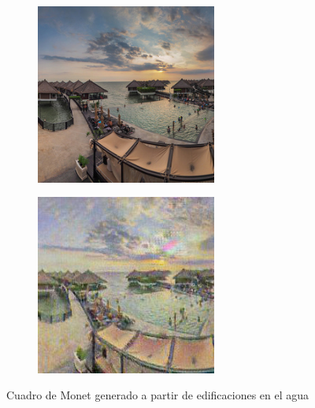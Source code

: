 \documentclass[[../main.tex]{subfiles}
\begin{document}
        \begin{figure}[!htb]
            \begin{subfigure}[b]{0.49\textwidth}
            \includegraphics[width=0.65\textwidth]{imagenes/imagen2cuadro/dataset/monet/2014-08-15 08_48_43.jpg}
            \end{subfigure}
        \hfill
            \begin{subfigure}[b]{0.49\textwidth}
            \includegraphics[width=0.65\textwidth]{imagenes/imagen2cuadro/dataset/monet/2014-08-15 08_48_43_2.jpg}
            \end{subfigure}
        \caption{Cuadro de Monet generado a partir de edificaciones en el agua}
        \label{fig:monet_cuadro_edificaciones_agua}
        \end{figure}
        
\end{document}
